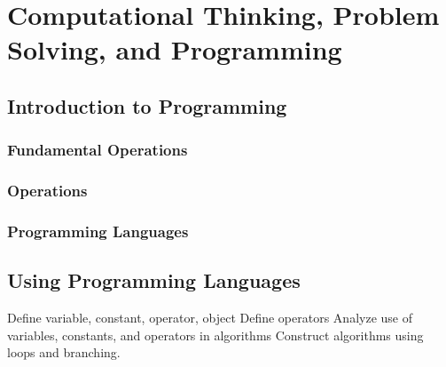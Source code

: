 \chapter{Computational Thinking, Problem Solving, and Programming}

\section{Introduction to Programming}

\subsection*{Fundamental Operations}

\subsection*{Operations}

\subsection*{Programming Languages}

\section{Using Programming Languages}

Define variable, constant, operator, object
Define operators
Analyze use of variables, constants, and operators in algorithms
Construct algorithms using loops and branching.

